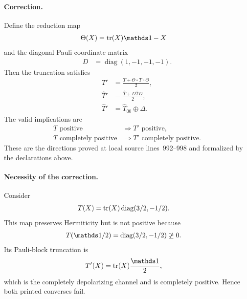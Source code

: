 \documentclass{article}
\begin{document}
\paragraph{Correction.}
Define the reduction map
\begin{align}
    \Theta(X)
        &=\tr(X)\Id-X
    \label{eq:wolf_lecture_notes_errata_pauli_reduction_map}
\end{align}
and the diagonal Pauli-coordinate matrix
\begin{align}
    D&=\operatorname{diag}(1,-1,-1,-1).
    \label{eq:wolf_lecture_notes_errata_pauli_sign_matrix}
\end{align}
Then the truncation satisfies
\begin{align}
    T'
        &=\frac{T+\Theta\circ T\circ\Theta}{2},
    \label{eq:wolf_lecture_notes_errata_pauli_map_average}\\
    \widehat T'
        &=\frac{\widehat T+D\widehat T D}{2},
    \label{eq:wolf_lecture_notes_errata_pauli_matrix_average}\\
    \widehat T'
        &=\widehat T_{00}\oplus\Delta.
    \label{eq:wolf_lecture_notes_errata_pauli_average_block_form}
\end{align}
The valid implications are
\begin{align}
    T\text{ positive}
        &\Longrightarrow T'\text{ positive},
    \label{eq:wolf_lecture_notes_errata_pauli_positive_forward}\\
    T\text{ completely positive}
        &\Longrightarrow T'\text{ completely positive}.
    \label{eq:wolf_lecture_notes_errata_pauli_cp_forward}
\end{align}
These are the directions proved at local source lines~992--998
\cite[Proposition~2.10]{Wolf2012Quantum} and formalized by the declarations
above.

\paragraph{Necessity of the correction.}
Consider
\begin{align}
    T(X)
        &=\operatorname{tr}(X)\operatorname{diag}(3/2,-1/2).
    \label{eq:wolf_lecture_notes_errata_pauli_counterexample_map}
\end{align}
This map preserves Hermiticity but is not positive because
\begin{align}
    T(\Id/2)
        &=\operatorname{diag}(3/2,-1/2)
        \not\geq0.
    \label{eq:wolf_lecture_notes_errata_pauli_counterexample_not_positive}
\end{align}
Its Pauli-block truncation is
\begin{align}
    T'(X)
        &=\tr(X)\frac{\Id}{2},
    \label{eq:wolf_lecture_notes_errata_pauli_counterexample_truncation}
\end{align}
which is the completely depolarizing channel and is completely positive.
Hence both printed converses fail.
\end{document}
